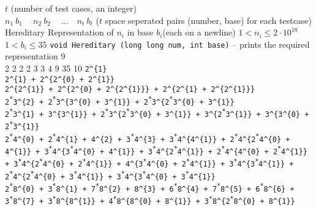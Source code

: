 \documentclass[../../Problems]{subfiles}
\begin{document}
\begin{testcasesFunctionMore}
	{$t$ \hfill(number of test cases, an integer)\\
	$n_1\ b_1\ \quad n_2\ b_2\ \quad \ldots\quad n_t\ b_t$ \hfill($t$ space seperated pairs (number, base) for each testcase)}
	{Hereditary Representation of $n_i$ in base $b_i$\hfill(each on a newline)}
	{$1 < n_i \leq 2 \cdot 10^{18}$\\
	$1 < b_i \leq 35$}
	{\texttt{void Hereditary (long long num, int base)} -- prints the required representation}
	{9\\2 2 2 2 3 3 4 9 35 10}
	{\texttt{2\^{}\{1\}}\\[0.7em]
\texttt{2\^{}\{1\} + 2\^{}\{2\^{}\{0\} + 2\^{}\{1\}\}}\\[0.7em]
\texttt{2\^{}\{2\^{}\{1\}\} + 2\^{}\{2\^{}\{0\} + 2\^{}\{2\^{}\{1\}\}\} + 2\^{}\{2\^{}\{1\} + 2\^{}\{2\^{}\{1\}\}\}}\\[0.7em]
\texttt{2\textsuperscript{*}3\^{}\{2\} + 2\textsuperscript{*}3\^{}\{3\^{}\{0\} + 3\^{}\{1\}\} + 2\textsuperscript{*}3\^{}\{2\textsuperscript{*}3\^{}\{0\} + 3\^{}\{1\}\}}\\[0.7em]
\texttt{2\textsuperscript{*}3\^{}\{1\} + 3\^{}\{3\^{}\{1\}\} + 2\textsuperscript{*}3\^{}\{2\textsuperscript{*}3\^{}\{0\} + 3\^{}\{1\}\} + 3\^{}\{2\textsuperscript{*}3\^{}\{1\}\} + 3\^{}\{3\^{}\{0\} + 2\textsuperscript{*}3\^{}\{1\}\}}\\[0.7em]
\texttt{2\textsuperscript{*}4\^{}\{0\} + 2\textsuperscript{*}4\^{}\{1\} + 4\^{}\{2\} + 3\textsuperscript{*}4\^{}\{3\} + 3\textsuperscript{*}4\^{}\{4\^{}\{1\}\} + 2\textsuperscript{*}4\^{}\{2\textsuperscript{*}4\^{}\{0\} + 4\^{}\{1\}\} + 3\textsuperscript{*}4\^{}\{3\textsuperscript{*}4\^{}\{0\} + 4\^{}\{1\}\} + 3\textsuperscript{*}4\^{}\{2\textsuperscript{*}4\^{}\{1\}\} + 2\textsuperscript{*}4\^{}\{4\^{}\{0\} + 2\textsuperscript{*}4\^{}\{1\}\} + 3\textsuperscript{*}4\^{}\{2\textsuperscript{*}4\^{}\{0\} + 2\textsuperscript{*}4\^{}\{1\}\} + 4\^{}\{3\textsuperscript{*}4\^{}\{0\} + 2\textsuperscript{*}4\^{}\{1\}\} + 3\textsuperscript{*}4\^{}\{3\textsuperscript{*}4\^{}\{1\}\} + 2\textsuperscript{*}4\^{}\{2\textsuperscript{*}4\^{}\{0\} + 3\textsuperscript{*}4\^{}\{1\}\} + 3\textsuperscript{*}4\^{}\{3\textsuperscript{*}4\^{}\{0\} + 3\textsuperscript{*}4\^{}\{1\}\}}\\[0.7em]
\texttt{2\textsuperscript{*}8\^{}\{0\} + 3\textsuperscript{*}8\^{}\{1\} + 7\textsuperscript{*}8\^{}\{2\} + 8\^{}\{3\} + 6\textsuperscript{*}8\^{}\{4\} + 7\textsuperscript{*}8\^{}\{5\} + 6\textsuperscript{*}8\^{}\{6\} + 3\textsuperscript{*}8\^{}\{7\} + 3\textsuperscript{*}8\^{}\{8\^{}\{1\}\} + 4\textsuperscript{*}8\^{}\{8\^{}\{0\} + 8\^{}\{1\}\} + 3\textsuperscript{*}8\^{}\{2\textsuperscript{*}8\^{}\{0\} + 8\^{}\{1\}\}}\\[0.7em]
}
\end{testcasesFunctionMore}
\end{document}
